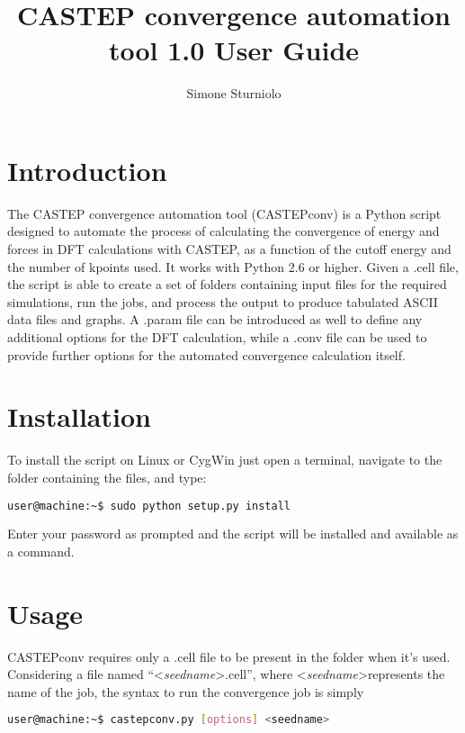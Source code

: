 \documentclass[10pt]{article}
\title{CASTEP convergence automation tool 1.0 User Guide}
\author{Simone Sturniolo}
\begin{document}
\maketitle

\section{Introduction}

The CASTEP convergence automation tool (CASTEPconv) is a Python script designed 
to automate the process of calculating the convergence of energy and forces in 
DFT calculations with CASTEP, as a function of the cutoff energy and the number 
of kpoints used. It works with Python 2.6 or higher. Given a .cell file, the 
script is able to create a set of folders containing input files for the 
required simulations, run the jobs, and process the output to produce tabulated 
ASCII data files and graphs. A .param file can be introduced as well to define 
any additional options for the DFT calculation, while a .conv file can be used 
to provide further options for the automated convergence calculation itself.

\section{Installation}

To install the script on Linux or CygWin just open a terminal, navigate to the 
folder containing the files, and type:

\begin{lstlisting}[language=Bash]
 user@machine:~$ sudo python setup.py install
\end{lstlisting}

Enter your password as prompted and the script will be installed and available 
as a command.

\section{Usage}

CASTEPconv requires only a .cell file to be present in the folder when it's 
used. Considering a file named ``\textless \textit{seedname}\textgreater.cell'', 
where \textless \textit{seedname}\textgreater represents the name of the job, 
the syntax to run the convergence job is simply

\begin{lstlisting}[language=Bash]
 user@machine:~$ castepconv.py [options] <seedname>
\end{lstlisting}
\end{document}
